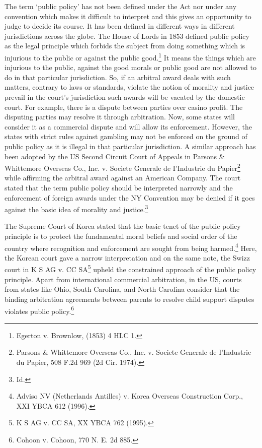 \begin{multicols}{2}
\noi
The term ‘public policy’ has not been defined under the Act nor under any convention which
makes it difficult to interpret and this gives an opportunity to judge to decide its course. It has
been defined in different ways in different jurisdictions across the globe. The House of Lords
in 1853 defined public policy as the legal principle which forbids the subject from doing
something which is injurious to the public or against the public good.\footnote{Egerton v. Brownlow, (1853) 4 HLC 1.} It means the things which are injurious to the public, against the good morals or public good are not allowed to do in that particular jurisdiction. So, if an arbitral award deals with such matters, contrary to laws or standards, violate the notion of morality and justice prevail in the court’s jurisdiction
such awards will be vacated by the domestic court. For example, there is a dispute between
parties over casino profit. The disputing parties may resolve it through arbitration. Now, some
states will consider it as a commercial dispute and will allow its enforcement. However, the
states with strict rules against gambling may not be enforced on the ground of public policy
as it is illegal in that particular jurisdiction. A similar approach has been adopted by the US
Second Circuit Court of Appeals in Parsons \& Whittemore Overseas Co., Inc. v. Societe
Generale de I’Industrie du Papier\footnote{Parsons \& Whittemore Overseas Co., Inc. v. Societe Generale de I’Industrie du Papier, 508 F.2d 969 (2d Cir. 1974).} while affirming the arbitral award against an American Company. The court stated that the term public policy should be interpreted narrowly and the enforcement of foreign awards under the NY Convention may be denied if it goes against the basic idea of morality and justice.\footnote{Id.}

\noi
The Supreme Court of Korea stated that the basic tenet of the public policy principle is to
protect the fundamental moral beliefs and social order of the country where recognition and
enforcement are sought from being harmed.\footnote{Adviso NV (Netherlands Antilles) v. Korea Overseas Construction Corp., XXI YBCA 612 (1996).} Here, the Korean court gave a narrow
interpretation and on the same note, the Swizz court in K S AG v. CC SA\footnote{K S AG v. CC SA, XX YBCA 762 (1995).} upheld the constrained approach of the public policy principle. Apart from international commercial arbitration, in the US, courts from states like Ohio, South Carolina, and North Carolina consider that the binding arbitration agreements between parents to resolve child support disputes violates public policy.\footnote{Cohoon v. Cohoon, 770 N. E. 2d 885.}


\end{multicols}
